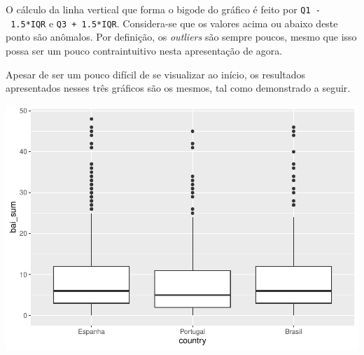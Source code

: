 \documentclass[
]{book}
\newenvironment{Shaded}{\begin{snugshade}}{\end{snugshade}}
\newcommand{\CommentTok}[1]{\textcolor[rgb]{0.56,0.35,0.01}{\textit{#1}}}
\newcommand{\DataTypeTok}[1]{\textcolor[rgb]{0.13,0.29,0.53}{#1}}
\newcommand{\DecValTok}[1]{\textcolor[rgb]{0.00,0.00,0.81}{#1}}
\newcommand{\FloatTok}[1]{\textcolor[rgb]{0.00,0.00,0.81}{#1}}
\newcommand{\KeywordTok}[1]{\textcolor[rgb]{0.13,0.29,0.53}{\textbf{#1}}}
\newcommand{\NormalTok}[1]{#1}
\newcommand{\OperatorTok}[1]{\textcolor[rgb]{0.81,0.36,0.00}{\textbf{#1}}}
\newcommand{\StringTok}[1]{\textcolor[rgb]{0.31,0.60,0.02}{#1}}
\begin{document}
O cálculo da linha vertical que forma o bigode do gráfico é feito por \texttt{Q1\ -\ 1.5*IQR} e \texttt{Q3\ +\ 1.5*IQR}. Considera-se que os valores acima ou abaixo deste ponto são anômalos. Por definição, os \emph{outliers} são sempre poucos, mesmo que isso possa ser um pouco contraintuitivo nesta apresentação de agora.

Apesar de ser um pouco difícil de se visualizar ao início, os resultados apresentados nesses três gráficos são os mesmos, tal como demonstrado a seguir.

\begin{Shaded}
\end{Shaded}

\begin{center}\includegraphics{gitbook-demo_files/figure-latex/unnamed-chunk-21-1} \end{center}
\end{document}
